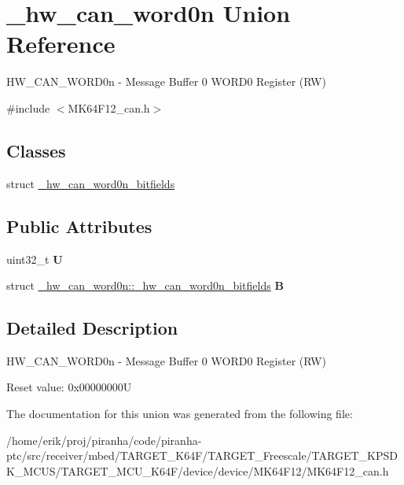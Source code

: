 \hypertarget{union__hw__can__word0n}{}\section{\+\_\+hw\+\_\+can\+\_\+word0n Union Reference}
\label{union__hw__can__word0n}


H\+W\+\_\+\+C\+A\+N\+\_\+\+W\+O\+R\+D0n -\/ Message Buffer 0 W\+O\+R\+D0 Register (RW)  




{\ttfamily \#include $<$M\+K64\+F12\+\_\+can.\+h$>$}

\subsection*{Classes}
\begin{DoxyCompactItemize}
\item 
struct \hyperlink{struct__hw__can__word0n_1_1__hw__can__word0n__bitfields}{\+\_\+hw\+\_\+can\+\_\+word0n\+\_\+bitfields}
\end{DoxyCompactItemize}
\subsection*{Public Attributes}
\begin{DoxyCompactItemize}
\item 
uint32\+\_\+t {\bfseries U}\hypertarget{union__hw__can__word0n_a22aa2964389a1dc20fec2d5bf62a8f4a}{}\label{union__hw__can__word0n_a22aa2964389a1dc20fec2d5bf62a8f4a}

\item 
struct \hyperlink{struct__hw__can__word0n_1_1__hw__can__word0n__bitfields}{\+\_\+hw\+\_\+can\+\_\+word0n\+::\+\_\+hw\+\_\+can\+\_\+word0n\+\_\+bitfields} {\bfseries B}\hypertarget{union__hw__can__word0n_a42fdd8e32ecdfbca5c155e8fe59510e1}{}\label{union__hw__can__word0n_a42fdd8e32ecdfbca5c155e8fe59510e1}

\end{DoxyCompactItemize}


\subsection{Detailed Description}
H\+W\+\_\+\+C\+A\+N\+\_\+\+W\+O\+R\+D0n -\/ Message Buffer 0 W\+O\+R\+D0 Register (RW) 

Reset value\+: 0x00000000U 

The documentation for this union was generated from the following file\+:\begin{DoxyCompactItemize}
\item 
/home/erik/proj/piranha/code/piranha-\/ptc/src/receiver/mbed/\+T\+A\+R\+G\+E\+T\+\_\+\+K64\+F/\+T\+A\+R\+G\+E\+T\+\_\+\+Freescale/\+T\+A\+R\+G\+E\+T\+\_\+\+K\+P\+S\+D\+K\+\_\+\+M\+C\+U\+S/\+T\+A\+R\+G\+E\+T\+\_\+\+M\+C\+U\+\_\+\+K64\+F/device/device/\+M\+K64\+F12/M\+K64\+F12\+\_\+can.\+h\end{DoxyCompactItemize}
